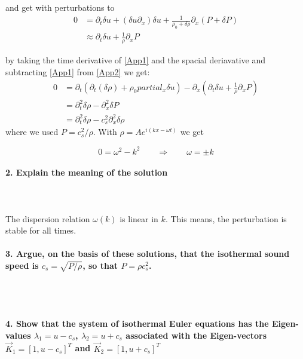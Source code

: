 and get with perturbations to
\begin{align}
	0 &= \partial_t \delta u + (\delta u \partial_x)\delta u + \frac{1}{\rho_0 + \delta \rho} \partial_x (P+\delta P) \\
	& \approx \partial_t \delta u + \frac{1}{\rho}\partial_x P
	\label{App2}
\end{align}

by taking the time derivative of \eqref{App1} and the spacial deriavative and subtracting \eqref{App1} from \eqref{App2} we get:
\begin{align}
	0&=\partial_t(\partial_t (\delta \rho)+ \rho_0 partial_x \delta u) - \partial_x (
	\partial_t \delta u + \frac{1}{\rho}\partial_x P)\\
	&= \partial_t^2\delta \rho - \partial_x^2 \delta P\\
    &= \partial_t^2\delta \rho - c_s^2\partial_x^2 \delta \rho
\end{align}
where we used $ P = c_s^2 / \rho$.
With $\rho = A e^{i(kx-\omega t)}$ we get

\begin{equation}
	0=\omega^2-k^2 \qquad\Rightarrow\qquad \omega= \pm k
\end{equation}



\paragraph{2. Explain the meaning of the
    solution
} \ \\
    \\
The dispersion relation $\omega(k)$ is linear in $k$. This means, the perturbation is stable for all times.

\paragraph{3. Argue, on the basis of these
    solutions, that the isothermal sound
    speed is $c_s=\sqrt{P/\rho}$, so that
    $P=\rho c_s^2$.
} \ \\
    \\

\paragraph{4. Show that the system of
    isothermal Euler equations has the
    Eigen-values $\lambda_{1}=u-c_s$,
    $\lambda_{2}=u+c_s$ associated with the
    Eigen-vectors $\vec K_{1}=[1, u-c_s]^T$
    and $\vec K_{2}=[1, u+c_s]^T$
}
